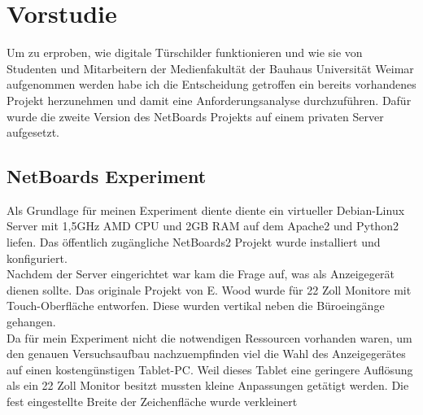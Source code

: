 \chapter{Vorstudie}\label{Vorstudie}
Um zu erproben, wie digitale Türschilder funktionieren und wie sie von Studenten und Mitarbeitern der Medienfakultät der Bauhaus Universität Weimar aufgenommen werden habe ich die Entscheidung getroffen ein bereits vorhandenes Projekt herzunehmen und damit eine Anforderungsanalyse durchzuführen.
Dafür wurde die zweite Version des NetBoards Projekts\cite{netboards:website} auf einem privaten Server aufgesetzt.
\section{NetBoards Experiment}\label{NetBoards Experiment}
Als Grundlage für meinen Experiment diente diente ein virtueller Debian-Linux Server mit 1,5GHz AMD CPU und 2GB RAM auf dem Apache2 und Python2 liefen. Das öffentlich zugängliche NetBoards2 Projekt wurde installiert und konfiguriert.\\
Nachdem der Server eingerichtet war kam die Frage auf, was als Anzeigegerät dienen sollte. Das originale Projekt von E. Wood wurde für 22 Zoll Monitore mit Touch-Oberfläche entworfen. Diese wurden vertikal neben die Büroeingänge gehangen.\\
Da für mein Experiment nicht die notwendigen Ressourcen vorhanden waren, um den genauen Versuchsaufbau nachzuempfinden viel die Wahl des Anzeigegerätes auf einen kostengünstigen Tablet-PC.
Weil dieses Tablet eine geringere Auflösung als ein 22 Zoll Monitor besitzt mussten kleine Anpassungen getätigt werden. Die fest eingestellte Breite der Zeichenfläche wurde verkleinert
